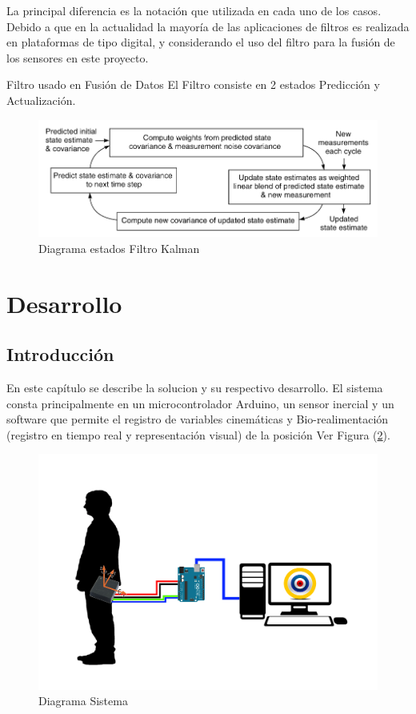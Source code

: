 \documentclass[12pt,a4paper]{article}
\begin{document}
La principal diferencia es la notación que utilizada en cada uno de los casos.
Debido a que en la actualidad la mayoría de las aplicaciones de filtros es realizada en plataformas de tipo digital, y considerando el uso del filtro para la fusión de los sensores en este proyecto.

Filtro usado en Fusión de Datos \cite{mau_how_2005} 
El Filtro consiste en 2 estados Predicción y Actualización.

\begin{figure}[H]
	\centering
	\includegraphics[scale=0.5]{images/kalman-filter.png} 
	\caption{Diagrama estados Filtro Kalman}
	\label{fig:diagramakalman}
\end{figure}

\section{Desarrollo}
\subsection{Introducción}
En este capítulo se describe la solucion y su respectivo desarrollo.
El sistema consta principalmente en un microcontrolador Arduino, un sensor inercial y un software que permite el registro de variables cinemáticas y Bio-realimentación (registro en tiempo real y representación visual) de la posición Ver Figura (\ref{fig:diagramasistema}).

\begin{figure}[H]
	\centering
	\includegraphics[scale=0.25]{images/diagrama_sistema}
	\caption{Diagrama Sistema}
	\label{fig:diagramasistema}
\end{figure}
\end{document}
